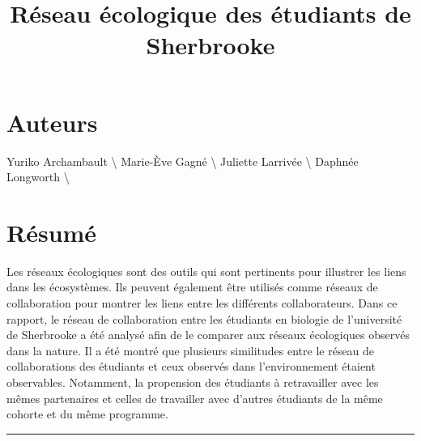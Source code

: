\documentclass[9pt,twocolumn,twoside,]{pnas-new}
\title{Réseau écologique des étudiants de Sherbrooke}
\begin{document}
\verticaladjustment{-2pt}



\maketitle
\thispagestyle{firststyle}


\acknow{}

\section*{Auteurs}

Yuriko Archambault \textbackslash{} Marie-Ève Gagné \textbackslash{}
Juliette Larrivée \textbackslash{} Daphnée Longworth \textbackslash{}

\hypertarget{ruxe9sumuxe9}{%
\section{Résumé}\label{ruxe9sumuxe9}}

Les réseaux écologiques sont des outils qui sont pertinents pour
illustrer les liens dans les écosystèmes. Ils peuvent également être
utilisés comme réseaux de collaboration pour montrer les liens entre les
différents collaborateurs. Dans ce rapport, le réseau de collaboration
entre les étudiants en biologie de l'université de Sherbrooke a été
analysé afin de le comparer aux réseaux écologiques observés dans la
nature. Il a été montré que plusieurs similitudes entre le réseau de
collaborations des étudiants et ceux observés dans l'environnement
étaient observables. Notamment, la propension des étudiants à
retravailler avec les mêmes partenaires et celles de travailler avec
d'autres étudiants de la même cohorte et du même programme.

\begin{center}\rule{0.5\linewidth}{0.5pt}\end{center}
\end{document}
